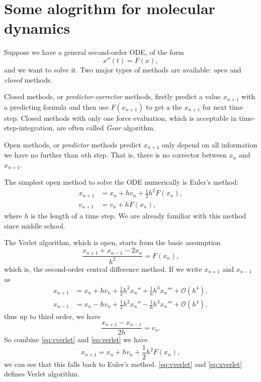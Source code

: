 
\section{Some alogrithm for molecular dynamics}

Suppose we have a general second-order ODE, of the form
\begin{equation}
  x''(t) = F(x),
\end{equation}
and we want to solve it. Two major types of methods are
available: \textit{open} and \textit{closed} methods.

Closed methods, or \textit{predictor-corrector} methods, firstly predict a value
$x_{n+1}$ with a predicting formula and then use $F(x_{n+1})$ to get a the $x_{n+1}$
for next time step. Closed methods with only one force evaluation, which is acceptable in time-step-integration,
are often called \textit{Gear} algorithm.

Open methods, or \textit{predictor} methods predict $x_{n+1}$ only depend on all
information we have no further than $n$th step. That is, there is no corrector between
$x_{n}$ and $x_{n+1}$.

The simplest  open method to solve the ODE numerically is Euler's method:
\begin{align}
x_{n+1} &= x_n + h v_n + \frac{ 1 }{ 2 } h^2 F(x_n),\\
v_{n+1} &= v_n + h F(x_n),
\end{align}
where $h$ is the length of a time step. We are already familiar with this method
since middle school.

The Verlet algorithm, which is open, starts from the basic assumption
\begin{equation}\label{eq:verlet}
	\frac{ x_{n+1} + x_{n-1} - 2 x_n }{ h^2 } = F(x_n),
\end{equation}
which is, the second-order central difference method.
If we write $x_{n+1}$ and $x_{n-1}$ as
\begin{align}
 x_{n+1} &= x_n + h v_n + \frac{ 1 }{ 2 } h^2 x_n'' + \frac{ 1 }{ 6 } h^3 x_n''' + \mathcal{O}(h^4),\\
 x_{n-1} &= x_n - h v_n + \frac{ 1 }{ 2 } h^2 x_n'' - \frac{ 1 }{ 6 } h^3 x_n''' + \mathcal{O}(h^4),
\end{align}
thus up to third order, we have
\begin{equation}\label{eq:vverlet}
 \frac{x_{n+1} - x_{n-1}}{2h} =  v_n.
\end{equation}
So combine \eqref{eq:vverlet} and \eqref{eq:verlet} we have
\begin{equation}\label{eq:xverlet}
  x_{n+1} = x_{n} + h v_{n} + \frac{ 1 }{ 2 } h^2 F(x_n),
\end{equation}
we can see that this falls back to Euler's method. \eqref{eq:vverlet} and \eqref{eq:xverlet}
defines Verlet algorithm.

